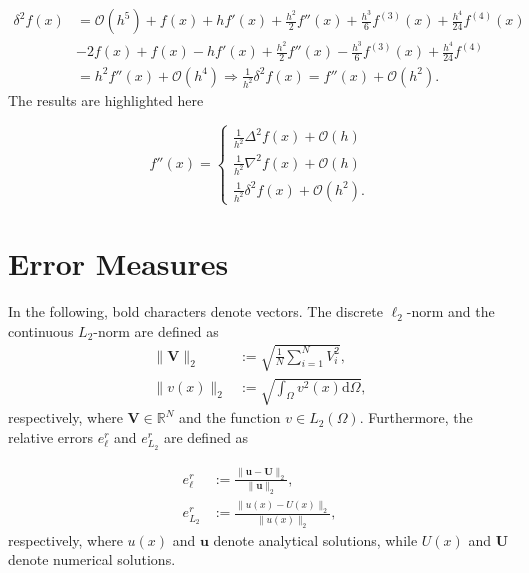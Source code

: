 \begin{equation*}
    \begin{split}
        \delta^2f(x) &= \mathcal{O}(h^5) + f(x) + hf'(x) + \frac{h^2}{2}f''(x) + \frac{h^3}{6}f^{(3)}(x) +\frac{h^4}{24}f^{(4)}(x)\\
        &-2f(x) + f(x) -hf'(x) + \frac{h^2}{2}f''(x) - \frac{h^3}{6}f^{(3)}(x) +\frac{h^4}{24}f^{(4)}\\
        &= h^2f''(x) + \mathcal{O}(h^4) \Rightarrow \frac{1}{h^2} \delta^2 f(x)=f''(x) + \mathcal{O}(h^2).
    \end{split}
\end{equation*}
The results are highlighted here


\begin{equation}
\label{Theory_approx_double_derivative}
  f''(x)=\left\{
    \begin{array}{ll}
      \frac{1}{h^2} \Delta^2 f(x) + \mathcal{O}(h)\\
      \frac{1}{h^2} \nabla^2 f(x) + \mathcal{O}(h) \\
      \frac{1}{h^2} \delta^2 f(x) + \mathcal{O}(h^2).
    \end{array}
  \right.
\end{equation}

\section{Error Measures}
\label{errors.section}

In the following, bold characters denote vectors.  
The discrete $\ell_2$-norm and the continuous $L_2$-norm are defined as
\begin{align}
    \|\boldsymbol{V}\|_2 &:= \sqrt{\frac1N \sum_{i=1}^N V_i^2}, \\
    \|v(x)\|_2 &:= \sqrt{\int_\Omega v^2(x) \mathrm{d}\Omega},
\end{align}
respectively, where $\boldsymbol{V} \in \mathbb{R}^N$ and the function $v \in L_2(\Omega)$. Furthermore, the relative errors $e_\ell^r$ and $e_{L_2}^r$ are defined as

\begin{align}
    e_\ell^r &:= \frac{\|\boldsymbol{u}-\boldsymbol{U}\|_2}{\|\boldsymbol{u}\|_2}, \label{discreteRelativeError} \\
    e_{L_2}^r &:= \frac{\|u(x)-U(x)\|_2}{\|u(x)\|_2},
\end{align}
respectively, where $u(x)$ and $\boldsymbol{u}$ denote analytical solutions, while $U(x)$ and $\boldsymbol{U}$ denote numerical solutions.

